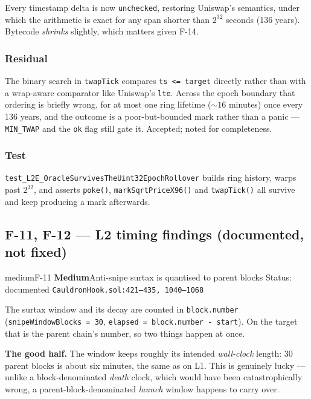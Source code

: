 \documentclass[11pt,a4paper]{article}
\newcommand{\code}[1]{\texttt{\small #1}}
\newcommand{\fileref}[1]{\texttt{\scriptsize #1}}
\begin{document}
Every timestamp delta is now \code{unchecked}, restoring Uniswap's semantics, under
which the arithmetic is exact for any span shorter than $2^{32}$ seconds
(136 years). Bytecode \emph{shrinks} slightly, which matters given F-14.

\subsubsection*{Residual}

The binary search in \code{twapTick} compares \code{ts <= target} directly rather
than with a wrap-aware comparator like Uniswap's \code{lte}. Across the epoch
boundary that ordering is briefly wrong, for at most one ring lifetime
(${\sim}16$ minutes) once every 136 years, and the outcome is a poor-but-bounded
mark rather than a panic --- \code{MIN\_TWAP} and the \code{ok} flag still gate it.
Accepted; noted for completeness.

\subsubsection*{Test}

\code{test\_L2E\_OracleSurvivesTheUint32EpochRollover} builds ring history, warps
past $2^{32}$, and asserts \code{poke()}, \code{markSqrtPriceX96()} and
\code{twapTick()} all survive and keep producing a mark afterwards.

\newpage
\subsection{F-11, F-12 --- L2 timing findings (documented, not fixed)}

\begin{findingbox}{medium}{F-11 \quad \textbf{Medium}\quad Anti-snipe surtax is quantised to parent blocks \quad Status: documented}
\fileref{CauldronHook.sol:421--435, 1040--1068}
\end{findingbox}

The surtax window and its decay are counted in \code{block.number}
(\code{snipeWindowBlocks = 30}, \code{elapsed = block.number - start}). On the
target that is the parent chain's number, so two things happen at once.

\textbf{The good half.} The window keeps roughly its intended \emph{wall-clock}
length: 30 parent blocks is about six minutes, the same as on L1. This is
genuinely lucky --- unlike a block-denominated \emph{death} clock, which would have
been catastrophically wrong, a parent-block-denominated \emph{launch} window
happens to carry over.
\end{document}
